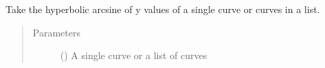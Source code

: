 \documentclass[letterpaper,10pt,english]{sphinxmanual}
\begin{document}
\begin{fulllineitems}
\label{\detokenize{pydv:pydvpy.asinh}}
Take the hyperbolic arcsine of y values of a single curve or curves in a list.

\begin{sphinxVerbatim}[commandchars=\\\{\}]
  
\end{sphinxVerbatim}

\begin{sphinxVerbatim}[commandchars=\\\{\}]
\end{sphinxVerbatim}
\begin{quote}\begin{description}
\item[{Parameters}] \leavevmode
{} () \textendash{} A single curve or a list of curves

\end{description}\end{quote}

\end{fulllineitems}

\end{document}
